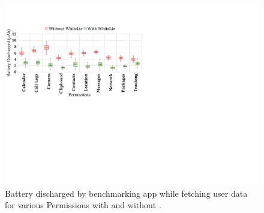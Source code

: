 \begin{figure}[t]
    \includegraphics[width=\linewidth]{Figures/Performance Evaluation/results_battery_discharged_battery_saver.pdf}
    \caption{Battery discharged by benchmarking app while fetching user data for various Permissions with and without \framework{}.}
    \label{fig:reslts_btrySaver}
\end{figure}



% 